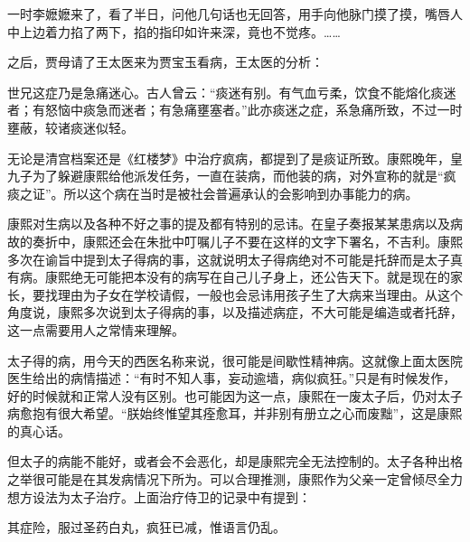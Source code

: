 
\begin{bookquote}一时李嬷嬷来了，看了半日，问他几句话也无回答，用手向他脉门摸了摸，嘴唇人中上边着力掐了两下，掐的指印如许来深，竟也不觉疼。……\end{bookquote}


之后，贾母请了王太医来为贾宝玉看病，王太医的分析：



\begin{bookquote}世兄这症乃是急痛迷心。古人曾云：“痰迷有别。有气血亏柔，饮食不能熔化痰迷者；有怒恼中痰急而迷者；有急痛壅塞者。”此亦痰迷之症，系急痛所致，不过一时壅蔽，较诸痰迷似轻。\end{bookquote}


无论是清宫档案还是《红楼梦》中治疗疯病，都提到了是痰证所致。康熙晚年，皇九子为了躲避康熙给他派发任务，一直在装病，而他装的病，对外宣称的就是“疯痰之证”。所以这个病在当时是被社会普遍承认的会影响到办事能力的病。



康熙对生病以及各种不好之事的提及都有特别的忌讳。在皇子奏报某某患病以及病故的奏折中，康熙还会在朱批中叮嘱儿子不要在这样的文字下署名，不吉利。康熙多次在谕旨中提到太子得病的事，这就说明太子得病绝对不可能是托辞而是太子真有病。康熙绝无可能把本没有的病写在自己儿子身上，还公告天下。就是现在的家长，要找理由为子女在学校请假，一般也会忌讳用孩子生了大病来当理由。从这个角度说，康熙多次说到太子得病的事，以及描述病症，不大可能是编造或者托辞，这一点需要用人之常情来理解。



太子得的病，用今天的西医名称来说，很可能是间歇性精神病。这就像上面太医院医生给出的病情描述：“有时不知人事，妄动逾墙，病似疯狂。”只是有时候发作，好的时候就和正常人没有区别。也可能因为这一点，康熙在一废太子后，仍对太子病愈抱有很大希望。“朕始终惟望其痊愈耳，并非别有册立之心而废黜”，这是康熙的真心话。



但太子的病能不能好，或者会不会恶化，却是康熙完全无法控制的。太子各种出格之举很可能是在其发病情况下所为。可以合理推测，康熙作为父亲一定曾倾尽全力想方设法为太子治疗。上面治疗侍卫的记录中有提到：



\begin{bookquote}其症险，服过圣药白丸，疯狂已减，惟语言仍乱。\end{bookquote}

